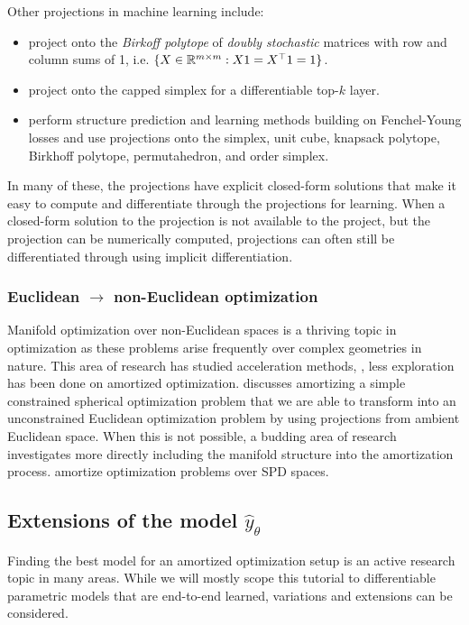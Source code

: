 \documentclass[twoside,11pt]{article}
\newcommand{\ie}{i.e.\xspace}
\begin{document}
\newpage
Other projections in machine learning include:
\begin{itemize}
\item \citet{adams2011ranking,santa2017deeppermnet,mena2018learning}
  project onto the \emph{Birkoff polytope} of
  \emph{doubly stochastic} matrices with row and
  column sums of 1, \ie
  $\{X\in\mathbb{R}^{m\times m}: X1=X^\top1=1\}$.
\item \citet{amos2019limited} project onto the capped
  simplex for a differentiable top-$k$ layer.
\item \citet{blondel2019structured} perform structure
  prediction and learning methods building on Fenchel-Young losses
  \citep{blondel2020learning} and use projections onto the
  simplex, unit cube, knapsack polytope, Birkhoff polytope,
  permutahedron, and order simplex.
\end{itemize}

In many of these, the projections have explicit closed-form
solutions that make it easy to compute and differentiate
through the projections for learning.
When a closed-form solution to the projection is not available to
the project, but the projection can be numerically computed,
projections can often still be differentiated through using
implicit differentiation.

\subsubsection{Euclidean $\rightarrow$ non-Euclidean optimization}
Manifold optimization \citep{absil2009optimization,hu2019brief}
over non-Euclidean spaces is a thriving topic in optimization
as these problems arise frequently over complex geometries in nature.
This area of research has studied acceleration methods,
\citep{duruisseaux2022accelerated}, less exploration
has been done on amortized optimization.
 discusses amortizing a simple
constrained spherical optimization problem that we are able
to transform into an unconstrained Euclidean optimization
problem by using projections from ambient Euclidean space.
When this is not possible, a budding area of research investigates
more directly including the manifold structure into the
amortization process. \citet{gao2020learning} amortize optimization
problems over SPD spaces.

\subsection{Extensions of the model $\hat y_\theta$}
Finding the best model for an amortized optimization setup
is an active research topic in many areas.
While we will mostly scope this tutorial to differentiable
parametric models that are end-to-end learned,
variations and extensions can be considered.
\end{document}
